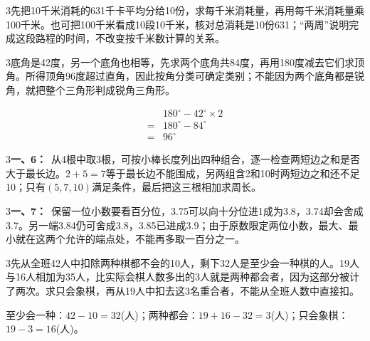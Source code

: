 \documentclass[multi=snippet,border={5bp 20bp 5bp 5bp}]{standalone}
\newenvironment{snippet}[3]{\begin{minipage}{#1bp}\color{answerred}\fontsize{#2}{#3}\selectfont\raggedright}{\end{minipage}}
\begin{document}
\begin{snippet}{505}{11.5}{14}\begin{multicols}{3}\raggedcolumns 先把10千米消耗的631千卡平均分给10份，求每千米消耗量，再用每千米消耗量乘100千米。也可把100千米看成10段10千米，核对总消耗是10份631；“两周”说明完成这段路程的时间，不改变按千米数计算的关系。\end{multicols}\end{snippet}
\begin{snippet}{505}{11.5}{14}\begin{multicols}{3}\raggedcolumns 底角是42度，另一个底角也相等，先求两个底角共84度，再用180度减去它们求顶角。所得顶角96度超过直角，因此按角分类可确定类别；不能因为两个底角都是锐角，就把整个三角形判成锐角三角形。\par \[\begin{aligned}&180^\circ-42^\circ\times2\\={}&180^\circ-84^\circ\\={}&96^\circ\end{aligned}\]\end{multicols}\end{snippet}
\begin{snippet}{505}{11.5}{14}\begin{multicols}{3}\raggedcolumns \textbf{一、6：}\ 从4根中取3根，可按小棒长度列出四种组合，逐一检查两短边之和是否大于最长边。\(2+5=7\)\allowbreak 等于最长边不能围成，另两组含2和10时两短边之和还不足10；只有\((5,\allowbreak 7,\allowbreak 10)\)\allowbreak 满足条件，最后把这三根相加求周长。\end{multicols}\end{snippet}
\begin{snippet}{505}{11.5}{14}\begin{multicols}{3}\raggedcolumns \textbf{一、7：}\ 保留一位小数要看百分位，3.75可以向十分位进1成为3.8，3.74却会舍成3.7。另一端3.84仍可舍成3.8，3.85已进成3.9；由于原数限定两位小数，最大、最小就在这两个允许的端点处，不能再多取一百分之一。\end{multicols}\end{snippet}
\begin{snippet}{505}{11.5}{14}\begin{multicols}{3}\raggedcolumns 先从全班42人中扣除两种棋都不会的10人，剩下32人是至少会一种棋的人。19人与16人相加为35人，比实际会棋人数多出的3人就是两种都会者，因为这部分被计了两次。求只会象棋，再从19人中扣去这3名重合者，不能从全班人数中直接扣。\par 至少会一种：\(42-10=32\)\allowbreak (人)；两种都会：\(19+16-32=3\)\allowbreak (人)；只会象棋：\(19-3=16\)\allowbreak (人)。\end{multicols}\end{snippet}
\end{document}

